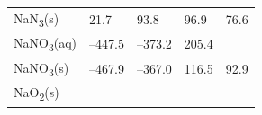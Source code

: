 \documentclass[
  9pt,
]{extbook}
\theoremstyle{definition}
\theoremstyle{definition}
\theoremstyle{definition}
\theoremstyle{remark}
\begin{document}
\begin{longtable}[]{@{}lllll@{}}
\begin{minipage}[t]{0.10\columnwidth}\raggedright
NaN\textsubscript{3}(s)\strut
\end{minipage} & \begin{minipage}[t]{0.19\columnwidth}\raggedright
21.7\strut
\end{minipage} & \begin{minipage}[t]{0.20\columnwidth}\raggedright
93.8\strut
\end{minipage} & \begin{minipage}[t]{0.18\columnwidth}\raggedright
96.9\strut
\end{minipage} & \begin{minipage}[t]{0.18\columnwidth}\raggedright
76.6\strut
\end{minipage}\tabularnewline
\begin{minipage}[t]{0.10\columnwidth}\raggedright
NaNO\textsubscript{3}(aq)\strut
\end{minipage} & \begin{minipage}[t]{0.19\columnwidth}\raggedright
--447.5\strut
\end{minipage} & \begin{minipage}[t]{0.20\columnwidth}\raggedright
--373.2\strut
\end{minipage} & \begin{minipage}[t]{0.18\columnwidth}\raggedright
205.4\strut
\end{minipage} & \begin{minipage}[t]{0.18\columnwidth}\raggedright
\strut
\end{minipage}\tabularnewline
\begin{minipage}[t]{0.10\columnwidth}\raggedright
NaNO\textsubscript{3}(s)\strut
\end{minipage} & \begin{minipage}[t]{0.19\columnwidth}\raggedright
--467.9\strut
\end{minipage} & \begin{minipage}[t]{0.20\columnwidth}\raggedright
--367.0\strut
\end{minipage} & \begin{minipage}[t]{0.18\columnwidth}\raggedright
116.5\strut
\end{minipage} & \begin{minipage}[t]{0.18\columnwidth}\raggedright
92.9\strut
\end{minipage}\tabularnewline
\begin{minipage}[t]{0.10\columnwidth}\raggedright
NaO\textsubscript{2}(s)\strut
\end{minipage} & \begin{minipage}[t]{0.19\columnwidth}\raggedright

\end{minipage}
\end{longtable}
\end{document}
